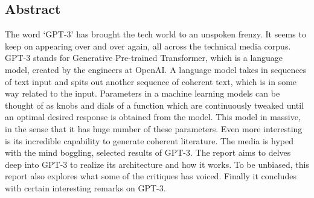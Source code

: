 \newpage
\vspace*{\fill}
\begin{center}
    \section*{Abstract}
\end{center}
The word `GPT-3' has brought the tech world to an unspoken frenzy. It seems to keep on appearing over and over again, all across the technical media corpus. GPT-3 stands for Generative Pre-trained Transformer, which is a language model, created by the engineers at OpenAI. A language model takes in sequences of text input and spits out another sequence of coherent text, which is in some way related to the input. Parameters in a machine learning models can be thought of as knobs and dials of a function which are continuously tweaked until an optimal desired response is obtained from the model. This model in massive, in the sense that it has huge number of these parameters. Even more interesting is its incredible capability to generate coherent literature. The media is hyped with the mind boggling, selected results of GPT-3. The report aims to delves deep into GPT-3 to realize its architecture and how it works. To be unbiased, this report also explores what some of the critiques has voiced. Finally it concludes with certain interesting remarks on GPT-3.
\vspace*{\fill}